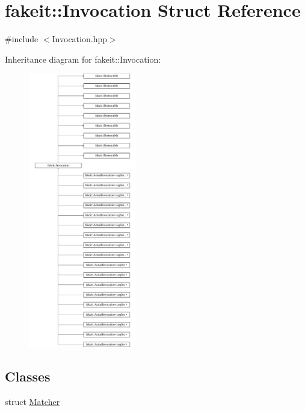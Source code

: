 \hypertarget{structfakeit_1_1Invocation}{}\section{fakeit\+::Invocation Struct Reference}
\label{structfakeit_1_1Invocation}


{\ttfamily \#include $<$Invocation.\+hpp$>$}

Inheritance diagram for fakeit\+::Invocation\+:\begin{figure}[H]
\begin{center}
\leavevmode
\includegraphics[height=12.000000cm]{structfakeit_1_1Invocation}
\end{center}
\end{figure}
\subsection*{Classes}
\begin{DoxyCompactItemize}
\item 
struct \mbox{\hyperlink{structfakeit_1_1Invocation_1_1Matcher}{Matcher}}
\end{DoxyCompactItemize}
